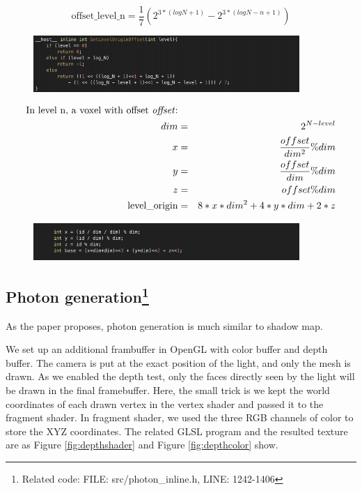 \documentclass[a4paper]{article}
\begin{document}
\begin{CJK*}{UTF8}{gkai}
$$\mbox{offset\_level\_n} = \frac{1}{7}(2^{3*(logN+1)} - 2^{3*(logN-n+1)})$$
\begin{figure}[H]
\centering
\includegraphics[width=0.9\textwidth]{eq3.png}
\end{figure}

\begin{eqnarray*}
\mbox{In level n, a voxel with offset \textit{offset}:} \\
dim & = & 2^{N-level} \\
x & = & \frac{{offset}}{ dim^2}\%dim \\
y & = & \frac{{offset}}{ dim}\%dim \\
z & = & {offset}\%dim \\
\mbox{level\_origin} & = & 8 * x *dim^2 + 4 * y *dim+ 2 * z
\end{eqnarray*}
\begin{figure}[H]
\centering
\includegraphics[width=0.9\textwidth]{eq4.png}
\end{figure}


\subsection[Photon generation]{Photon generation\footnote{Related code: FILE: src/photon\_inline.h, LINE: 1242-1406}}
As the paper proposes, photon generation is much similar to shadow map.

We set up an additional frambuffer in OpenGL with color buffer and depth buffer. The camera is put at the exact position of the light, and only the mesh is drawn. As we enabled the depth test, only the faces directly seen by the light will be drawn in the final framebuffer. Here, the small trick is we kept the world coordinates of each drawn vertex in the vertex shader and passed it to the fragment shader. In fragment shader, we used the three RGB channels of color to store the XYZ coordinates. The related GLSL program and the resulted texture are as Figure \ref{fig:depthshader} and Figure \ref{fig:depthcolor} show.


\end{CJK*}
\end{document}

